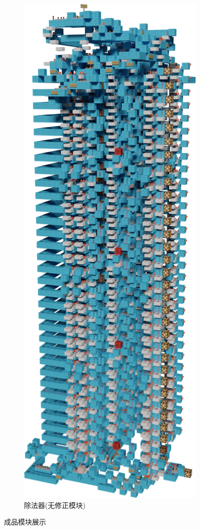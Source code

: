 \documentclass[UTF8,12pt,punct=kaiming,fontset=none]{article}
\begin{document}
\begin{figure}[H]
\begin{subfigure}{1.5in}
            \includegraphics[width=\linewidth]{PSN.png}
            \caption{除法器(无修正模块)}
        \end{subfigure}
	    \caption{成品模块展示}
	    \label{fig7} %
    \end{figure}
    
\end{document}
